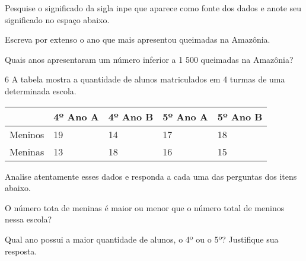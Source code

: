 {%

\begin{escolha}
\item
  Pesquise o significado da sigla inpe que aparece como fonte dos dados
  e anote seu significado no espaço abaixo.


\item
  Escreva por extenso o ano que mais apresentou queimadas na Amazônia.


\item
  Quais anos apresentaram um número inferior a 1 500 queimadas na
  Amazônia?

\end{escolha}


\num{6} A tabela mostra a quantidade de alunos matriculados em 4 turmas de
uma determinada escola.

\begin{longtable}[]{@{}lllll@{}}
\toprule
& 4º Ano A & 4º Ano B & 5º Ano A & 5º Ano B\tabularnewline
\midrule
\endhead
Meninos & 19 & 14 & 17 & 18\tabularnewline
Meninas & 13 & 18 & 16 & 15\tabularnewline
\bottomrule
\end{longtable}

Analise atentamente esses dados e responda a cada uma das perguntas dos
itens abaixo.

\begin{escolha}
\item
  O número tota de meninas é maior ou menor que o número total de
  meninos nessa escola?


\item
  Qual ano possui a maior quantidade de alunos, o 4º ou o 5º? Justifique
  sua resposta.

\end{escolha}


}
